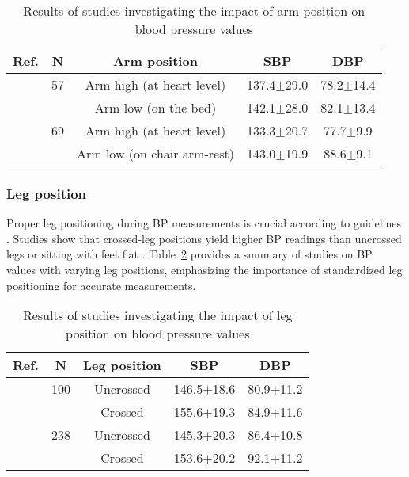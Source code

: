 \documentclass[journal,article,moreauthors]{Definitions/mdpi}
\begin{document}
\begin{table}[tb]
\caption{Results of studies investigating the impact of arm position on blood pressure values}\label{Tab: Arm position}
\begin{center}
\begin{tabular}{rcccc}
\toprule
\textbf{Ref.} & \textbf{N} & \textbf{Arm position} & \textbf{SBP} & \textbf{DBP} \\
\hline
\citep{Netea2003} & 57  & Arm high (at heart level) & 
137.4$\pm$29.0 &  78.2$\pm$14.4\\
                 &     & Arm low (on the bed)      &
142.1$\pm$28.0 & 82.1$\pm$13.4\\
\hline
\citep{netea1999arm} & 69  & Arm high (at heart level) & 
133.3$\pm$20.7 &  77.7$\pm$9.9\\
                 &     & Arm low (on chair arm-rest)  &
143.0$\pm$19.9 &  88.6$\pm$9.1\\
\bottomrule
\end{tabular}
\end{center}
\end{table}

\subsubsection{Leg position}
Proper leg positioning during BP measurements is crucial according to guidelines \citep{FosterFitzpatrick1999}. Studies show that crossed-leg positions yield higher BP readings than uncrossed legs or sitting with feet flat \citep{adiyaman2007effect, kallioinen2017sources}. Table~\ref{Tab: Leg position} provides a summary of studies on BP values with varying leg positions, emphasizing the importance of standardized leg positioning for accurate measurements.

\begin{table}[tb]
\caption{Results of studies investigating the impact of leg position on blood pressure values }\label{Tab: Leg position}
\begin{center}
\begin{tabular}{rcccc}
\toprule
\textbf{Ref.} & \textbf{N} &\textbf{Leg position} & \textbf{SBP} & \textbf{DBP} \\
\hline
\citep{Foster-Fitzpatrick1999-us} & 100 & Uncrossed & 146.5$\pm$18.6 & 80.9$\pm$11.2
\\
& & Crossed & 155.6$\pm$19.3 & 84.9$\pm$11.6  
\\\hline
\citep{Pinar2004-nq} & 238  & Uncrossed & 145.3$\pm$20.3 & 86.4$\pm$10.8
\\ & & Crossed & 153.6$\pm$20.2 & 92.1$\pm$11.2 
\\
\bottomrule
\end{tabular}
\end{center}
\end{table}
\end{document}
